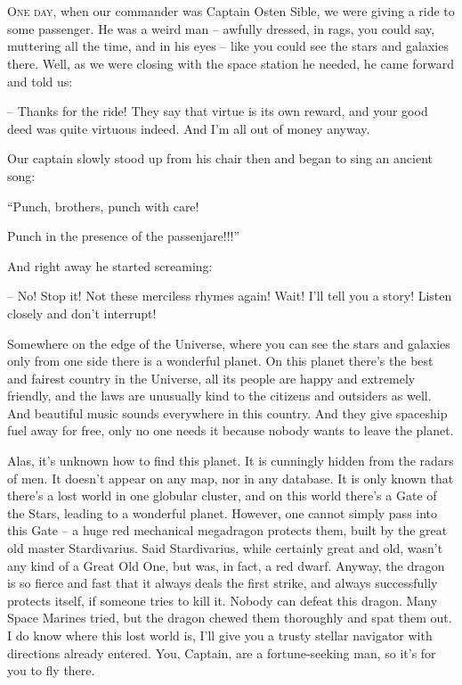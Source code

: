\documentclass[ebook,twoside,final,openright]{memoir}
\begin{document}
\chapter{}
\par
\lettrine{O}{ne day,} when our commander was Captain Osten Sible, we were giving a ride to some passenger. He was a weird man – awfully dressed, in rags, you could say, muttering all the time, and in his eyes – like you could see the stars and galaxies there. Well, as we were closing with the space station he needed, he came forward and told us: \par
\par
– Thanks for the ride! They say that virtue is its own reward, and your good deed was quite virtuous indeed. And I’m all out of money anyway.\par
Our captain slowly stood up from his chair then and began to sing an ancient song: \par
“Punch, brothers, punch with care! \par
 Punch in the presence of the passenjare!!!” \par
And right away he started screaming: \par
 – No! Stop it! Not these merciless rhymes again! Wait! I'll tell you a story! Listen closely and don’t interrupt!\par
\par
Somewhere on the edge of the Universe, where you can see the stars and galaxies only from one side there is a wonderful planet. On this planet there’s the best and fairest country in the Universe, all its people are happy and extremely friendly, and the laws are unusually kind to the citizens and outsiders as well. And beautiful music sounds everywhere in this country. And they give spaceship fuel away for free, only no one needs it because nobody wants to leave the planet. \par
Alas, it’s unknown how to find this planet. It is cunningly hidden from the radars of men. It doesn’t appear on any map, nor in any database. It is only known that there’s a lost world in one globular cluster, and on this world there’s a Gate of the Stars, leading to a wonderful planet. However, one cannot simply pass into this Gate – a huge red mechanical megadragon protects them, built by the great old master Stardivarius. Said Stardivarius, while certainly great and old, wasn’t any kind of a Great Old One, but was, in fact, a red dwarf. Anyway, the dragon is so fierce and fast that it always deals the first strike, and always successfully protects itself, if someone tries to kill it. Nobody can defeat this dragon. Many Space Marines tried, but the dragon chewed them thoroughly and spat them out. I do know where this lost world is, I'll give you a trusty stellar navigator with directions already entered. You, Captain, are a fortune-seeking man, so it’s for you to fly there.\par
\end{document}

